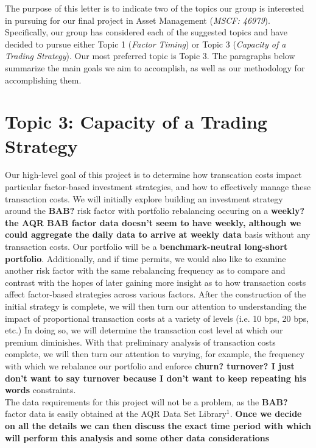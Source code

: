 \documentclass[12pt]{article}
\begin{document}
\maketitle

The purpose of this letter is to indicate two of the topics our group is interested in pursuing for our final project in Asset Management (\textit{MSCF: 46979}). Specifically, our group has considered each of the suggested topics and have decided to pursue either Topic 1 (\textit{Factor Timing}) or Topic 3 (\textit{Capacity of a Trading Strategy}). Our most preferred topic is Topic 3. The paragraphs below summarize the main goals we aim to accomplish, as well as our methodology for accomplishing them.

\section{Topic 3: Capacity of a Trading Strategy}

Our high-level goal of this project is to determine how transcation costs impact particular factor-based investment strategies, and how to effectively manage these transaction costs. We will initially explore building an investment strategy around the \textbf{BAB?} risk factor with portfolio rebalancing occuring on a \textbf{weekly? the AQR BAB factor data doesn't seem to have weekly, although we could aggregate the daily data to arrive at weekly data} basis without any transaction costs. Our portfolio will be a \textbf{benchmark-neutral long-short portfolio}. Additionally, and if time permits, we would also like to examine another risk factor with the same rebalancing frequency as to compare and contrast with the hopes of later gaining more insight as to how transaction costs affect factor-based strategies across various factors. After the construction of the initial strategy is complete, we will then turn our attention to understanding the impact of proportional transaction costs at a variety of levels (i.e. 10 bps, 20 bps, etc.) In doing so, we will determine the transaction cost level at which our premium diminishes. With that preliminary analysis of transaction costs complete, we will then turn our attention to varying, for example, the frequency with which we rebalance our portfolio and enforce \textbf{churn? turnover? I just don't want to say turnover because I don't want to keep repeating his words} constraints. \\
The data requirements for this project will not be a problem, as the \textbf{BAB?} factor data is easily obtained at the AQR Data Set Library$^{1}$. \textbf{Once we decide on all the details we can then discuss the exact time period with which will perform this analysis and some other data considerations}
\end{document}

